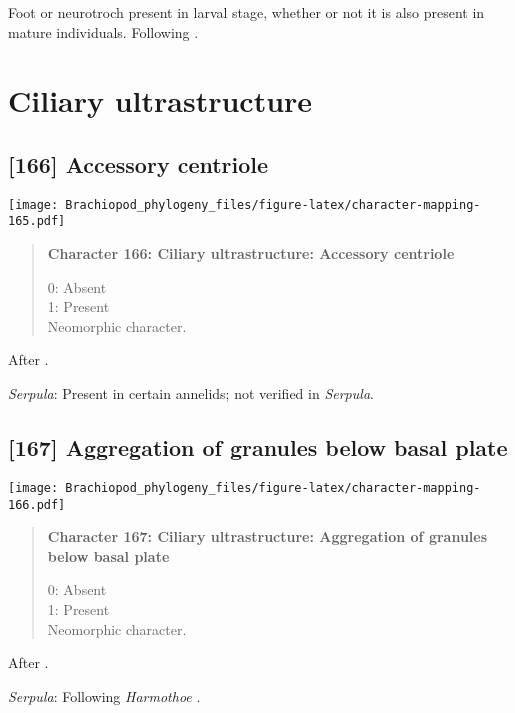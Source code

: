 \documentclass[openany]{book}
\theoremstyle{definition}
\theoremstyle{definition}
\theoremstyle{definition}
\theoremstyle{remark}
\begin{document}
Foot or neurotroch present in larval stage, whether or not it is also
present in mature individuals. Following \citet{Wingstrand1985}.

\section{Ciliary ultrastructure}\label{ciliary-ultrastructure}

\subsection*{{[}166{]} Accessory centriole}\label{accessory-centriole}

\texttt{[image: Brachiopod\_phylogeny\_files/figure-latex/character-mapping-165.pdf]}

\begin{quote}
\textbf{Character 166: Ciliary ultrastructure: Accessory centriole}

0: Absent\\
1: Present\\
Neomorphic character.
\end{quote}

After \citet{Lundin2009}.

\hypertarget{Serpula-coding-166}{}
\emph{Serpula}: Present in certain annelids; not verified in
\emph{Serpula}.

\subsection*{{[}167{]} Aggregation of granules below basal
plate}\label{aggregation-of-granules-below-basal-plate}

\texttt{[image: Brachiopod\_phylogeny\_files/figure-latex/character-mapping-166.pdf]}

\begin{quote}
\textbf{Character 167: Ciliary ultrastructure: Aggregation of granules
below basal plate}

0: Absent\\
1: Present\\
Neomorphic character.
\end{quote}

After \citet{Lundin2009}.

\hypertarget{Serpula-coding-167}{}
\emph{Serpula}: Following \emph{Harmothoe} \citep{Holborow1969}.
\end{document}

